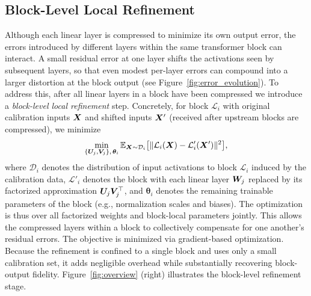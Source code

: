 \documentclass[10pt]{article} %
\theoremstyle{definition}
\theoremstyle{remark}
\begin{document}
\subsection{Block-Level Local Refinement}

Although each linear layer is compressed to minimize its own output error, the errors introduced by different layers within the same transformer block can interact.
A small residual error at one layer shifts the activations seen by subsequent layers, so that even modest per-layer errors can compound into a larger distortion at the block output (see Figure~\ref{fig:error_evolution}).
To address this, after all linear layers in a block have been compressed we introduce a \emph{block-level local refinement} step.
Concretely, for block $\mathcal{L}_i$ with original calibration inputs ${\bm{X}}$ and shifted inputs ${\bm{X}}'$ (received after upstream blocks are compressed), we minimize
\[
\min_{\{{\bm{U}}_j,{\bm{V}}_j\},\,\boldsymbol{\theta}_i} \mathbb{E}_{{\bm{X}} \sim \mathcal{D}_i}\bigl[\|\mathcal{L}_i({\bm{X}}) - \mathcal{L}'_i({\bm{X}}')\|^2\bigr],
\]
where $\mathcal{D}_i$ denotes the distribution of input activations to block $\mathcal{L}_i$ induced by the calibration data, $\mathcal{L}'_i$ denotes the block with each linear layer ${\bm{W}}_j$ replaced by its factorized approximation ${\bm{U}}_j{\bm{V}}_j^\top$, and $\boldsymbol{\theta}_i$ denotes the remaining trainable parameters of the block (e.g., normalization scales and biases).
The optimization is thus over all factorized weights and block-local parameters jointly.
This allows the compressed layers within a block to collectively compensate for one another's residual errors.
The objective is minimized via gradient-based optimization.
Because the refinement is confined to a single block and uses only a small calibration set, it adds negligible overhead while substantially recovering block-output fidelity. Figure~\ref{fig:overview} (right) illustrates the block-level refinement stage.
\end{document}
